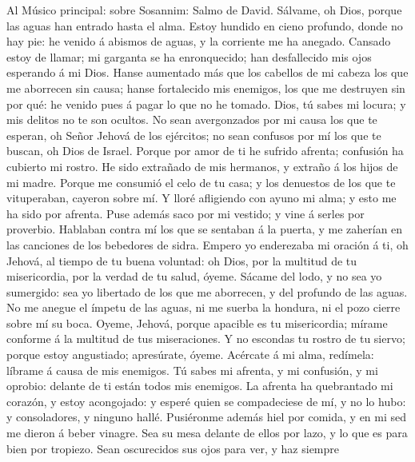  Al Músico principal: sobre Sosannim: Salmo de David.
Sálvame, oh Dios, porque las aguas han entrado hasta el alma.
 Estoy hundido en cieno profundo, donde no hay pie: he
venido á abismos de aguas, y la corriente me ha anegado. 
Cansado estoy de llamar; mi garganta se ha enronquecido; han
desfallecido mis ojos esperando á mi Dios.  Hanse
aumentado más que los cabellos de mi cabeza los que me aborrecen sin
causa; hanse fortalecido mis enemigos, los que me destruyen sin por qué:
he venido pues á pagar lo que no he tomado.  Dios, tú
sabes mi locura; y mis delitos no te son ocultos.  No sean
avergonzados por mi causa los que te esperan, oh Señor Jehová de los
ejércitos; no sean confusos por mí los que te buscan, oh Dios de Israel.
 Porque por amor de ti he sufrido afrenta; confusión ha
cubierto mi rostro.  He sido extrañado de mis hermanos, y
extraño á los hijos de mi madre.  Porque me consumió el
celo de tu casa; y los denuestos de los que te vituperaban, cayeron
sobre mí.  Y lloré afligiendo con ayuno mi alma; y esto
me ha sido por afrenta.  Puse además saco por mi vestido;
y vine á serles por proverbio.  Hablaban contra mí los
que se sentaban á la puerta, y me zaherían en las canciones de los
bebedores de sidra.  Empero yo enderezaba mi oración á
ti, oh Jehová, al tiempo de tu buena voluntad: oh Dios, por la multitud
de tu misericordia, por la verdad de tu salud, óyeme. 
Sácame del lodo, y no sea yo sumergido: sea yo libertado de los que me
aborrecen, y del profundo de las aguas.  No me anegue el
ímpetu de las aguas, ni me suerba la hondura, ni el pozo cierre sobre mí
su boca.  Oyeme, Jehová, porque apacible es tu
misericordia; mírame conforme á la multitud de tus miseraciones.
 Y no escondas tu rostro de tu siervo; porque estoy
angustiado; apresúrate, óyeme.  Acércate á mi alma,
redímela: líbrame á causa de mis enemigos.  Tú sabes mi
afrenta, y mi confusión, y mi oprobio: delante de ti están todos mis
enemigos.  La afrenta ha quebrantado mi corazón, y estoy
acongojado: y esperé quien se compadeciese de mí, y no lo hubo: y
consoladores, y ninguno hallé.  Pusiéronme además hiel
por comida, y en mi sed me dieron á beber vinagre.  Sea
su mesa delante de ellos por lazo, y lo que es para bien por tropiezo.
 Sean oscurecidos sus ojos para ver, y haz siempre
